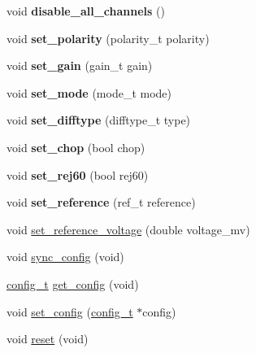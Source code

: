 \begin{DoxyCompactItemize}
\item 
\mbox{\label{classAD7193_a27e857f32ccd4a5ae4e716da450c50c9}} 
void {\bfseries disable\+\_\+all\+\_\+channels} ()
\item 
\mbox{\label{classAD7193_a4d24c6cc404cd65acef4586b31af7c89}} 
void {\bfseries set\+\_\+polarity} (polarity\+\_\+t polarity)
\item 
\mbox{\label{classAD7193_a235045e14deeac1aba118ef34e37aaa3}} 
void {\bfseries set\+\_\+gain} (gain\+\_\+t gain)
\item 
\mbox{\label{classAD7193_ad13ef26d1aaa8ba941e9fea4b6c436ff}} 
void {\bfseries set\+\_\+mode} (mode\+\_\+t mode)
\item 
\mbox{\label{classAD7193_ae753f9fdc55acc00c0a0a28dc5116bb2}} 
void {\bfseries set\+\_\+difftype} (difftype\+\_\+t type)
\item 
\mbox{\label{classAD7193_a17f4b0d8f504f19b696c91feb649ebd2}} 
void {\bfseries set\+\_\+chop} (bool chop)
\item 
\mbox{\label{classAD7193_ab623d6ccfb1aefe8fb41a611f04f78c6}} 
void {\bfseries set\+\_\+rej60} (bool rej60)
\item 
\mbox{\label{classAD7193_a8e7dd2c971617b81366c6ce44e95b2e3}} 
void {\bfseries set\+\_\+reference} (ref\+\_\+t reference)
\item 
void \hyperlink{classAD7193_ac9bf997384928f28bee7c6cdb784f4bb}{set\+\_\+reference\+\_\+voltage} (double voltage\+\_\+mv)
\item 
void \hyperlink{classAD7193_a5fa5a3b5bf71472df93bb413f20ca7b6}{sync\+\_\+config} (void)
\item 
\hyperlink{structAD7193_1_1config__t}{config\+\_\+t} \hyperlink{classAD7193_aeca1d2066808496b08cca1274b5f330b}{get\+\_\+config} (void)
\item 
void \hyperlink{classAD7193_a5b066aba7096fb2db5d91661a46862da}{set\+\_\+config} (\hyperlink{structAD7193_1_1config__t}{config\+\_\+t} $\ast$config)
\item 
void \hyperlink{classAD7193_a5b1bbfb3b90e7034bba4f14c397ebcb4}{reset} (void)
\end{DoxyCompactItemize}
